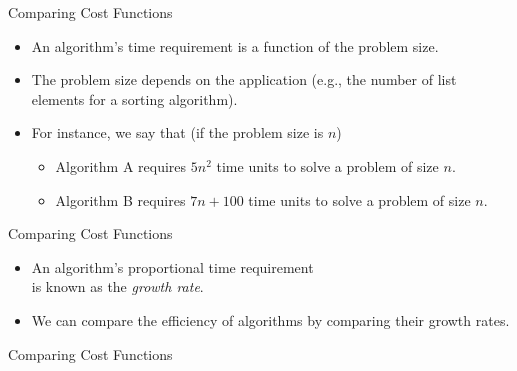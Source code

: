 \documentclass[14pt,aspectratio=1610, hyperref={pdfpagelayout=SinglePage}]{beamer}
\begin{document}
\begin{frame}{Comparing Cost Functions}
  \begin{itemize}[<+->]
  \item An algorithm's time requirement is a function of the problem size.
  \item The problem size depends on the application (e.g., the number of list elements for a sorting algorithm). %
  \item For instance, we say that (if the problem size is \(n\))
  \begin{itemize}
    \item Algorithm A requires \(5n^2\) time units to solve a problem of size \(n\).
    \item Algorithm B requires \(7n + 100\)  time units to solve a problem of size \(n\).
  \end{itemize}
  \end{itemize}
\end{frame}

\begin{frame}{Comparing Cost Functions}
  \begin{itemize}[<+->]
    \item An algorithm's proportional time requirement\\ is known as the \emph{growth rate}.
    \item We can compare the efficiency of algorithms by comparing their growth rates.
  \end{itemize}
\end{frame}

\begin{frame}[fragile]{Comparing Cost Functions}



\end{frame}
\end{document}

